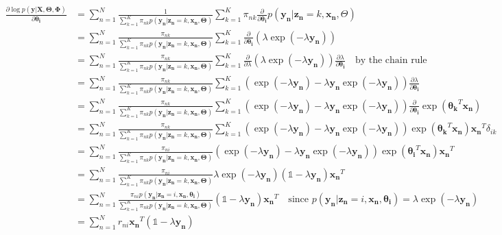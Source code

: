 \documentclass[12pt,a4paper,oneside]{paper}
\begin{document}
\begin{align*}
    \frac{\partial \log p(\bm{y} | \bm{X}, \bm{\Theta}, \bm{\Phi})}{\partial \bm{\theta_i}} &= \sum_{n=1}^{N} \frac{1}{\sum_{k=1}^{K} \pi_{nk} p(\bm{y_n} | \bm{z_n} = k, \bm{x_n}, \bm{\Theta})} \sum_{k=1}^{K} \pi_{nk} \frac{\partial}{\partial \bm{\theta_i}} p(\bm{y_n} | \bm{z_n} = k, \bm{x_n}, \Theta) \\
    &= \sum_{n=1}^{N} \frac{\pi_{nk}}{\sum_{k=1}^{K} \pi_{nk} p(\bm{y_n} | \bm{z_n} = k, \bm{x_n}, \bm{\Theta})} \sum_{k=1}^{K} \frac{\partial}{\partial \bm{\theta_i}} \left(\lambda \exp(-\lambda \bm{y_n}) \right) \\
    &= \sum_{n=1}^{N} \frac{\pi_{nk}}{\sum_{k=1}^{K} \pi_{nk} p(\bm{y_n} | \bm{z_n} = k, \bm{x_n}, \bm{\Theta})} \sum_{k=1}^{K} \frac{\partial}{\partial \lambda} \left(\lambda \exp(-\lambda \bm{y_n}) \right) \frac{\partial \lambda}{\partial \bm{\theta_i}} \quad \text{by the chain rule} \\
    &= \sum_{n=1}^{N} \frac{\pi_{nk}}{\sum_{k=1}^{K} \pi_{nk} p(\bm{y_n} | \bm{z_n} = k, \bm{x_n}, \bm{\Theta})} \sum_{k=1}^{K} (\exp(-\lambda \bm{y_n}) - \lambda \bm{y_n} \exp(-\lambda \bm{y_n})) \frac{\partial \lambda}{\partial \bm{\theta_i}} \\
    &= \sum_{n=1}^{N} \frac{\pi_{nk}}{\sum_{k=1}^{K} \pi_{nk} p(\bm{y_n} | \bm{z_n} = k, \bm{x_n}, \bm{\Theta})} \sum_{k=1}^{K} (\exp(-\lambda \bm{y_n}) - \lambda \bm{y_n} \exp(-\lambda \bm{y_n})) \frac{\partial}{\partial \bm{\theta_i}} \exp(\bm{\theta_k}^T \bm{x_n}) \\
    &= \sum_{n=1}^{N} \frac{\pi_{nk}}{\sum_{k=1}^{K} \pi_{nk} p(\bm{y_n} | \bm{z_n} = k, \bm{x_n}, \bm{\Theta})} \sum_{k=1}^{K} (\exp(-\lambda \bm{y_n}) - \lambda \bm{y_n} \exp(-\lambda \bm{y_n})) \exp(\bm{\theta_k}^T \bm{x_n}) \bm{x_n}^T \delta_{ik} \\
    &= \sum_{n=1}^{N} \frac{\pi_{ni}}{\sum_{k=1}^{K} \pi_{nk} p(\bm{y_n} | \bm{z_n} = k, \bm{x_n}, \bm{\Theta})} (\exp(-\lambda \bm{y_n}) - \lambda \bm{y_n} \exp(-\lambda \bm{y_n})) \exp(\bm{\theta_i}^T \bm{x_n}) \bm{x_n}^T \\
    &= \sum_{n=1}^{N} \frac{\pi_{ni}}{\sum_{k=1}^{K} \pi_{nk} p(\bm{y_n} | \bm{z_n} = k, \bm{x_n}, \bm{\Theta})} \lambda \exp(-\lambda \bm{y_n}) (\mathds{1} - \lambda \bm{y_n}) \bm{x_n}^T \\
    &= \sum_{n=1}^{N} \frac{\pi_{ni} p(\bm{y_n} | \bm{z_n} = i, \bm{x_n}, \bm{\theta_i})}{\sum_{k=1}^{K} \pi_{nk} p(\bm{y_n} | \bm{z_n} = k, \bm{x_n}, \bm{\Theta})} (\mathds{1} - \lambda \bm{y_n}) \bm{x_n}^T \quad \text{since $p(\bm{y_n} | \bm{z_n} = i, \bm{x_n}, \bm{\theta_i}) = \lambda \exp(-\lambda \bm{y_n})$} \\
    &= \sum_{n=1}^{N} r_{ni} \bm{x_n}^T (\mathds{1} - \lambda \bm{y_n}) 
\end{align*}
\end{document}
